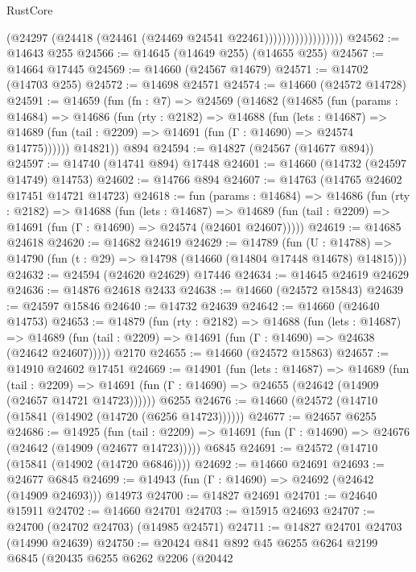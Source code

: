\begin{lexlean}{RustCore}
\begin{coremodule}
                                (@24297 (@24418 (@24461 (@24469 @24541 @22461))))))))))))))))))
@24562 := @14643 @255
@24566 := @14645 (@14649 @255) (@14655 @255)
@24567 := @14664 @17445
@24569 := @14660 (@24567 @14679)
@24571 := @14702 (@14703 @255)
@24572 := @14698 @24571
@24574 := @14660 (@24572 @14728)
@24591 := @14659
    (fun (fn : @7) =>
    @24569
      (@14682
        (@14685
          (fun (params : @14684) =>
          @14686
            (fun (rty : @2182) =>
            @14688
              (fun (lets : @14687) =>
              @14689 (fun (tail : @2209) => @14691 (fun (Γ : @14690) => @24574 @14775))))))
        @14821))
    @894
@24594 := @14827 (@24567 (@14677 @894))
@24597 := @14740 (@14741 @894) @17448
@24601 := @14660 (@14732 (@24597 @14749) @14753)
@24602 := @14766 @894
@24607 := @14763 (@14765 @24602 @17451 @14721 @14723)
@24618 := fun (params : @14684) =>
  @14686
    (fun (rty : @2182) =>
    @14688
      (fun (lets : @14687) =>
      @14689 (fun (tail : @2209) => @14691 (fun (Γ : @14690) => @24574 (@24601 @24607)))))
@24619 := @14685 @24618
@24620 := @14682 @24619
@24629 := @14789
    (fun (U : @14788) => @14790 (fun (t : @29) => @14798 (@14660 (@14804 @17448 @14678) @14815)))
@24632 := @24594 (@24620 @24629) @17446
@24634 := @14645 @24619 @24629
@24636 := @14876 @24618 @2433
@24638 := @14660 (@24572 @15843)
@24639 := @24597 @15846
@24640 := @14732 @24639
@24642 := @14660 (@24640 @14753)
@24653 := @14879
    (fun (rty : @2182) =>
    @14688
      (fun (lets : @14687) =>
      @14689 (fun (tail : @2209) => @14691 (fun (Γ : @14690) => @24638 (@24642 @24607)))))
    @2170
@24655 := @14660 (@24572 @15863)
@24657 := @14910 @24602 @17451
@24669 := @14901
    (fun (lets : @14687) =>
    @14689
      (fun (tail : @2209) =>
      @14691 (fun (Γ : @14690) => @24655 (@24642 (@14909 (@24657 @14721 @14723))))))
    @6255
@24676 := @14660 (@24572 (@14710 (@15841 (@14902 (@14720 (@6256 @14723))))))
@24677 := @24657 @6255
@24686 := @14925
    (fun (tail : @2209) => @14691 (fun (Γ : @14690) => @24676 (@24642 (@14909 (@24677 @14723)))))
    @6845
@24691 := @24572 (@14710 (@15841 (@14902 (@14720 @6846))))
@24692 := @14660 @24691
@24693 := @24677 @6845
@24699 := @14943 (fun (Γ : @14690) => @24692 (@24642 (@14909 @24693))) @14973
@24700 := @14827 @24691
@24701 := @24640 @15911
@24702 := @14660 @24701
@24703 := @15915 @24693
@24707 := @24700 (@24702 @24703) (@14985 @24571)
@24711 := @14827 @24701 @24703 (@14990 @24639)
@24750 := @20424
    @841
    @892
    @45
    @6255
    @6264
    @2199
    @6845
    (@20435
      @6255
      @6262
      @2206
      (@20442

\end{coremodule}
\end{lexlean}
